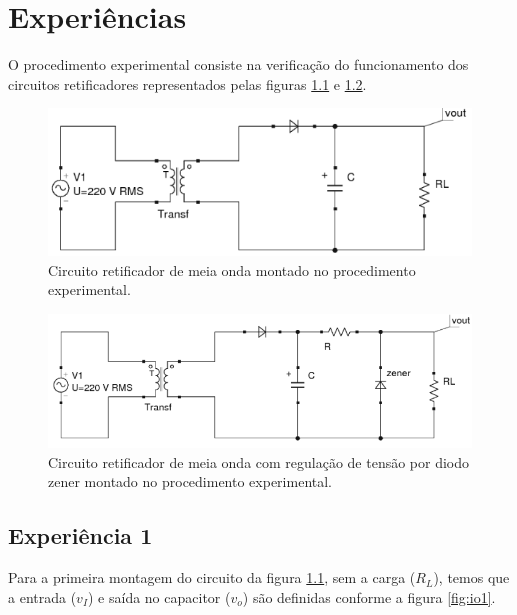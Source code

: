 \documentclass{abntex2}
\begin{document}
\imprimircapa
\imprimirfolhaderosto

\tableofcontents
\listoffigures
\clearpage

\chapter{Experiências}

O procedimento experimental consiste na verificação do funcionamento dos circuitos retificadores representados pelas figuras \ref{fig:circuito1} e \ref{fig:circuito2}.

\begin{figure}[h]
  \centering
  \includegraphics[scale = 0.7]{circuito1.png}
  \caption{Circuito retificador de meia onda montado no procedimento experimental.}
  \label{fig:circuito1}
\end{figure}

\begin{figure}[h]
  \centering
  \includegraphics[scale = 0.7]{circuito2.png}
  \caption{Circuito retificador de meia onda com regulação de tensão por diodo zener montado no procedimento experimental.}
  \label{fig:circuito2}
\end{figure}

\section{Experiência 1}

Para a primeira montagem do circuito da figura \ref{fig:circuito1}, sem a carga ($R_L$), temos que a entrada ($v_I$) e saída no capacitor ($v_o$) são definidas conforme a figura \ref{fig:io1}.
\pagebreak
\end{document}
